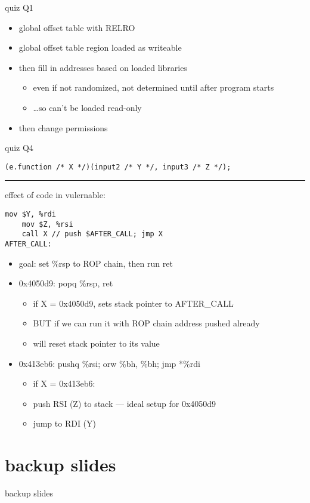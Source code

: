 \begin{frame}{quiz Q1}
    \begin{itemize}
    \item global offset table with RELRO
    \vspace{.5cm}
    \item global offset table region loaded as writeable
    \item then fill in addresses based on loaded libraries
        \begin{itemize}
        \item even if not randomized, not determined until after program starts
        \item \ldots so can't be loaded read-only
        \end{itemize}
    \item then change permissions
    \end{itemize}
\end{frame}
\begin{frame}[fragile]{quiz Q4}
\begin{Verbatim}[fontsize=\fontsize{10}{11}]
(e.function /* X */)(input2 /* Y */, input3 /* Z */);
\end{Verbatim}
\hrule
effect of code in vulernable:
\begin{Verbatim}[fontsize=\fontsize{10}{11}]
    mov $Y, %rdi
    mov $Z, %rsi
    call X // push $AFTER_CALL; jmp X
AFTER_CALL:
\end{Verbatim}
\begin{itemize}
\item goal: set \%rsp to ROP chain, then run ret
\item 0x4050d9: popq \%rsp, ret
    \begin{itemize}
    \item if X = 0x4050d9, sets stack pointer to AFTER\_CALL
    \item BUT if we can run it with ROP chain address pushed already
    \item will reset stack pointer to its value
    \end{itemize}
\item 0x413eb6: pushq \%rsi; orw \%bh, \%bh; jmp *\%rdi
    \begin{itemize}
    \item if X = 0x413eb6:
    \item push RSI (Z) to stack --- ideal setup for 0x4050d9
    \item jump to RDI (Y)
    \end{itemize}
\end{itemize}
\end{frame}








\section{backup slides}
\begin{frame}{backup slides}
\end{frame}


